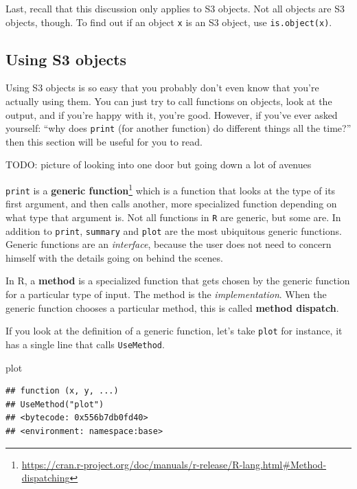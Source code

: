 \documentclass[
  12pt,
]{krantz}
\makeatletter
\newenvironment{Shaded}{\begin{snugshade}}{\end{snugshade}}
\newcommand{\NormalTok}[1]{#1}
\renewcommand{\href}[2]{#2\footnote{\url{#1}}}
\newenvironment{kframe}{%
\medskip{}
\setlength{\fboxsep}{.8em}
 \def\at@end@of@kframe{}%
 \ifinner\ifhmode%
  \def\at@end@of@kframe{\end{minipage}}%
  \begin{minipage}{\columnwidth}%
 \fi\fi%
 \def\FrameCommand##1{\hskip\@totalleftmargin \hskip-\fboxsep
 \colorbox{shadecolor}{##1}\hskip-\fboxsep
     \hskip-\linewidth \hskip-\@totalleftmargin \hskip\columnwidth}%
 \MakeFramed {\advance\hsize-\width
   \@totalleftmargin\z@ \linewidth\hsize
   \@setminipage}}%
 {\par\unskip\endMakeFramed%
 \at@end@of@kframe}
\renewenvironment{Shaded}{\begin{kframe}}{\end{kframe}}
\makeatother
\begin{document}
Last, recall that this discussion only applies to S3 objects. Not all objects are S3 objects, though. To find out if an object \texttt{x} is an S3 object, use \texttt{is.object(x)}.

\hypertarget{using-s3-objects}{%
\subsection{Using S3 objects}\label{using-s3-objects}}

Using S3 objects is so easy that you probably don't even know that you're actually using them. You can just try to call functions on objects, look at the output, and if you're happy with it, you're good. However, if you've ever asked yourself: ``why does \texttt{print} (for another function) do different things all the time?'' then this section will be useful for you to read.

TODO: picture of looking into one door but going down a lot of avenues

\texttt{print} is a \href{https://cran.r-project.org/doc/manuals/r-release/R-lang.html\#Method-dispatching}{\textbf{generic function}} which is a function that looks at the type of its first argument, and then calls another, more specialized function depending on what type that argument is. Not all functions in \texttt{R} are generic, but some are. In addition to \texttt{print}, \texttt{summary} and \texttt{plot} are the most ubiquitous generic functions. Generic functions are an \emph{interface}, because the user does not need to concern himself with the details going on behind the scenes.

In R, a \textbf{method} is a specialized function that gets chosen by the generic function for a particular type of input. The method is the \emph{implementation}. When the generic function chooses a particular method, this is called \textbf{method dispatch}.

If you look at the definition of a generic function, let's take \texttt{plot} for instance, it has a single line that calls \texttt{UseMethod}.

\begin{Shaded}
\begin{Highlighting}[]
\NormalTok{plot}
\end{Highlighting}
\end{Shaded}

\begin{verbatim}
## function (x, y, ...) 
## UseMethod("plot")
## <bytecode: 0x556b7db0fd40>
## <environment: namespace:base>
\end{verbatim}
\end{document}
